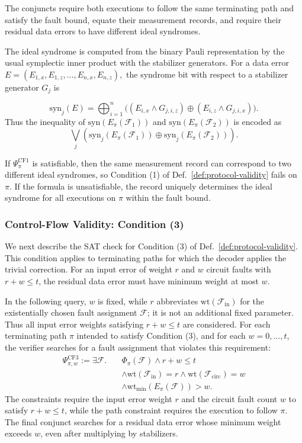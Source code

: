 \documentclass[acmsmall,screen,review,anonymous,nonacm]{acmart}
\begin{document}
The conjuncts require both executions to follow the same terminating
path and satisfy the fault bound, equate their measurement records,
and require their residual data errors to have different ideal syndromes.

The ideal syndrome is computed from the binary Pauli representation by the
usual symplectic inner product with the stabilizer generators. For a data error
$
E=(E_{1,x},E_{1,z},\ldots,E_{n,x},E_{n,z}),
$
the syndrome bit with respect to a stabilizer generator $G_j$ is

\[
\mathrm{syn}_j(E) = \bigoplus_{i=1}^n \bigl( (E_{i,x} \land G_{j,i,z}) \oplus (E_{i,z} \land G_{j,i,x}) \bigr).
\]
Thus the inequality of 
$
\mathrm{syn}(E_\pi(\mathcal{F}_1))
$ and $
\mathrm{syn}(E_\pi(\mathcal{F}_2))
$
is encoded as
\[
\bigvee_j
\left(
\mathrm{syn}_j(E_\pi(\mathcal{F}_1))
\oplus
\mathrm{syn}_j(E_\pi(\mathcal{F}_2))
\right).
\]

If $\Psi^{\mathrm{CF1}}_\pi$ is satisfiable, then the same measurement record
can correspond to two different ideal syndromes, so Condition (1) of
Def.~\ref{def:protocol-validity} fails on $\pi$. If the formula is
unsatisfiable, the record uniquely determines the ideal syndrome
for all executions on $\pi$ within the fault bound.

\subsubsection{Control-Flow Validity: Condition (3)}
\label{subsec:cf-validity-condition3}


We next describe the SAT check for Condition (3) of
Def.~\ref{def:protocol-validity}. This condition applies to terminating
paths for which the decoder applies the trivial correction. For an input
error of weight $r$ and $w$ circuit faults with $r+w\le t$, the residual
data error must have minimum weight at most $w$.

In the following query, $w$ is fixed, while
$r$ abbreviates $\mathrm{wt}(\mathcal F_{\mathrm{in}})$ for the
existentially chosen fault assignment $\mathcal F$; it is not
an additional fixed parameter. Thus all input error weights satisfying
$r+w\le t$ are considered.
For each terminating path $\pi$ intended to satisfy Condition (3), and for each
$w=0,\ldots,t$, the verifier searches for a fault assignment that violates this
requirement:
\begin{equation}
\begin{aligned}
\Psi^{\mathrm{CF3}}_{\pi,w}
:=\exists\mathcal F.\quad
&\Phi_\pi(\mathcal F)\land r+w\le t\\
&\land\mathrm{wt}(\mathcal F_{\mathrm{in}})=r
\land\mathrm{wt}(\mathcal F_{\mathrm{circ}})=w\\
&\land\mathrm{wt}_{\min}(E_\pi(\mathcal F))>w.
\end{aligned}
\end{equation}
The constraints require the input error weight $r$ and the circuit fault
count $w$ to satisfy $r+w\le t$, while the path constraint requires the
execution to follow $\pi$. The final conjunct searches for a residual
data error whose minimum weight exceeds $w$, even after multiplying by
stabilizers.
\end{document}
